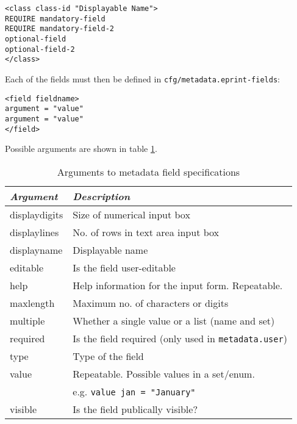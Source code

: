 \begin{verbatim}
<class class-id "Displayable Name">
REQUIRE mandatory-field
REQUIRE mandatory-field-2
optional-field
optional-field-2
</class>
\end{verbatim}

Each of the fields must then be defined in {\tt cfg/metadata.eprint-fields}:

\begin{verbatim}
<field fieldname>
argument = "value"
argument = "value"
</field>
\end{verbatim}

Possible arguments are shown in table \ref{install_meta_args}.

\begin{table}
\begin{center}
\begin{tabular}{|l|l|}
\hline
\emph{Argument} & \emph{Description}                                       \\
\hline
displaydigits   & Size of numerical input box                              \\
displaylines    & No. of rows in text area input box                       \\
displayname     & Displayable name                                         \\
editable        & Is the field user-editable                               \\
help            & Help information for the input form. Repeatable.         \\
maxlength       & Maximum no. of characters or digits                      \\
multiple        & Whether a single value or a list (name and set)          \\
required        & Is the field required (only used in {\tt metadata.user}) \\
type            & Type of the field                                        \\
value           & Repeatable. Possible values in a set/enum.               \\
                & e.g. {\tt value jan = "January"}                         \\
visible         & Is the field publically visible?                         \\
\hline
\end{tabular}
\caption{\label{install_meta_args} Arguments to metadata field specifications}
\end{center}
\end{table}

